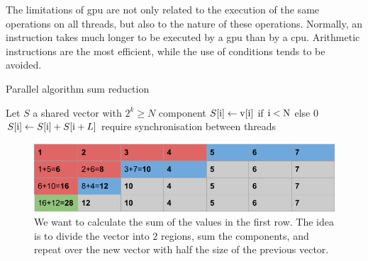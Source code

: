 \noindent The limitations of \gls{gpu} are not only related to the execution of the same operations on all threads, but also to the nature of these operations. Normally, an instruction takes much longer to be executed by a \gls{gpu} than by a \gls{cpu}. Arithmetic instructions are the most efficient, while the use of conditions tends to be avoided.

\begin{algorithm}
\caption{Parallel algorithm sum reduction}
\begin{algorithmic}[1]
    \State Let $S$ a shared vector with $2^k \geq N$ component
    \State $S[\textnormal{i}] \gets \textnormal{v}[\textnormal{i}]$ if $\textnormal{i}<\textnormal{N}$ else $0$
            \State $S[\textnormal{i}] \gets S[\textnormal{i}] + S[\textnormal{i}+L]$
        \EndIf
        \State require synchronisation between threads
    \EndFor
\EndProcedure
\label{alg:gpu_reduction}
\end{algorithmic}
\end{algorithm}

\begin{figure}[h]
\includegraphics[width=\linewidth]{Figures/example_gpu_reduction.png}
\caption{We want to calculate the sum of the values in the first row. The idea is to divide the vector into $2$ regions, sum the components, and repeat over the new vector with half the size of the previous vector.}
\end{figure}
